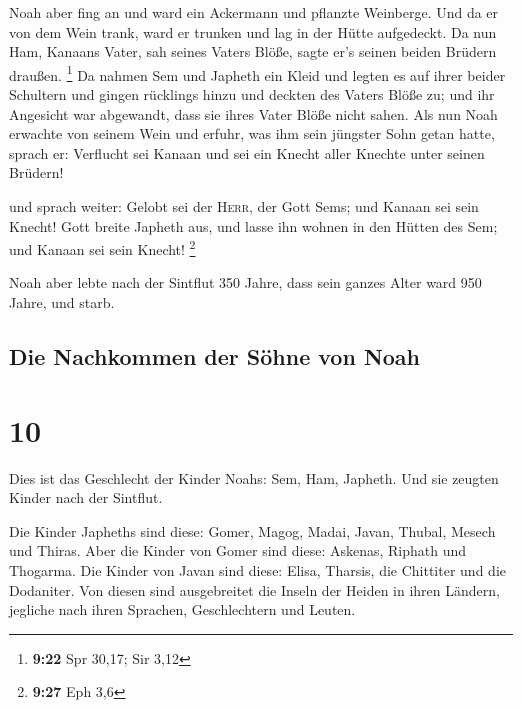  Noah aber fing an und ward ein Ackermann und pflanzte
Weinberge.  Und da er von dem Wein trank, ward er trunken
und lag in der Hütte aufgedeckt.  Da nun Ham, Kanaans
Vater, sah seines Vaters Blöße, sagte er's seinen beiden Brüdern
draußen. \footnote{\textbf{9:22} Spr 30,17; Sir 3,12}  Da
nahmen Sem und Japheth ein Kleid und legten es auf ihrer beider
Schultern und gingen rücklings hinzu und deckten des Vaters Blöße zu;
und ihr Angesicht war abgewandt, dass sie ihres Vater Blöße nicht sahen.
 Als nun Noah erwachte von seinem Wein und erfuhr, was
ihm sein jüngster Sohn getan hatte,  sprach er: Verflucht
sei Kanaan und sei ein Knecht aller Knechte unter seinen Brüdern!

 und sprach weiter: Gelobt sei der \textsc{Herr}, der
Gott Sems; und Kanaan sei sein Knecht!  Gott breite
Japheth aus, und lasse ihn wohnen in den Hütten des Sem; und Kanaan sei
sein Knecht! \footnote{\textbf{9:27} Eph 3,6}

 Noah aber lebte nach der Sintflut 350 Jahre,
 dass sein ganzes Alter ward 950 Jahre, und starb.

\hypertarget{die-nachkommen-der-suxf6hne-von-noah}{%
\subsection{Die Nachkommen der Söhne von
Noah}\label{die-nachkommen-der-suxf6hne-von-noah}}

\hypertarget{section-9}{%
\section{10}\label{section-9}}

 Dies ist das Geschlecht der Kinder Noahs: Sem, Ham,
Japheth. Und sie zeugten Kinder nach der Sintflut.

 Die Kinder Japheths sind diese: Gomer, Magog, Madai,
Javan, Thubal, Mesech und Thiras.  Aber die Kinder von
Gomer sind diese: Askenas, Riphath und Thogarma.  Die
Kinder von Javan sind diese: Elisa, Tharsis, die Chittiter und die
Dodaniter.  Von diesen sind ausgebreitet die Inseln der
Heiden in ihren Ländern, jegliche nach ihren Sprachen, Geschlechtern und
Leuten.

